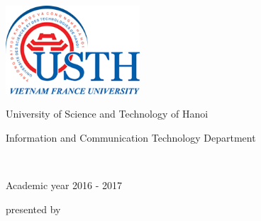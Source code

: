 \newpage
\empty
\thispagestyle{empty}

\begin{center}






\includegraphics[angle=0,width=5cm]{images/logo-1_39.png}


\vspace*{1cm} 



{\huge University of Science and Technology of Hanoi }\\


\vspace*{1cm} 


{\large Information and Communication Technology Department}\\


\vspace*{1cm} 



{\huge \MasterLevel }\\


\vspace*{1cm} 

{\large Academic year 2016 -  2017}


\vfill


\noindent\hrulefill

\vspace*{2mm} 

{\Large \InternshipTitle }


\noindent\hrulefill





\vfill 



{\large presented by } \\

\vspace*{5mm} 


{\large \bf \FirstName~  \LastName} \\


\vspace*{5mm} 



\end{center}
